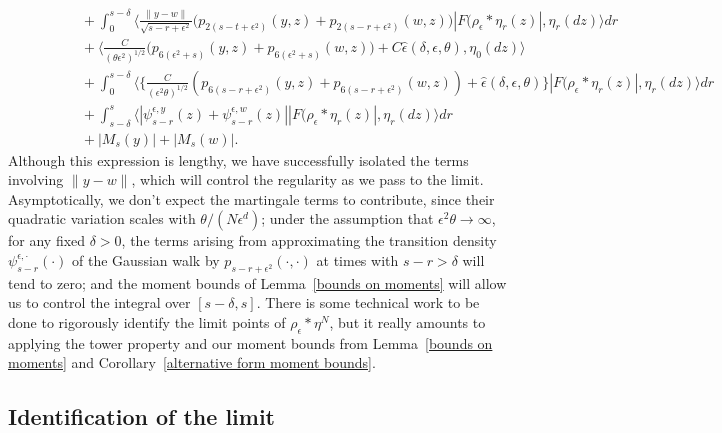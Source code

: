 \documentclass[EJP]{ejpecp} %
\begin{document}
\begin{align}
\nonumber
\\ & \qquad \qquad  {}
+
\int_0^{s-\delta}\Big\langle\frac{\|y-w\|}{\sqrt{s-r+\epsilon^2}}
    \big(p_{2(s-t+\epsilon^2)}(y,z)+p_{2(s-r+\epsilon^2)}(w,z)\big)
    |F(\rho_\epsilon*\eta_r(z)|, 
\eta_r(dz)\Big\rangle dr
\nonumber
\\ & \qquad \qquad  {}
+
\Big\langle \frac{C}{(\theta\epsilon^2)^{1/2}}\Big( 
	p_{6(\epsilon^2+s)}(y,z)+p_{6(\epsilon^2+s)}(w,z)\Big)+
	C \widehat{\epsilon}(\delta,\epsilon,\theta) , \eta_0(dz)
\Big\rangle
\nonumber
\\ & \qquad \qquad  {}
+
\int_0^{s-\delta}
\big\langle \Big\{
\frac{C}{(\epsilon^2\theta)^{1/2}}
(p_{6(s-r+\epsilon^2)}(y,z)+ p_{6(s-r+\epsilon^2)}(w,z))
+\widehat{\epsilon}(\delta,\epsilon,\theta)\Big\}
|F(\rho_\epsilon*\eta_r(z)|, 
\eta_r(dz) \big\rangle  dr
\nonumber
    \\ &\qquad \qquad {}
+ \int_{s-\delta}^s \big\langle 
|\psi_{s-r}^{\epsilon,y}(z) + \psi_{s-r}^{\epsilon, w}(z) |
|F(\rho_\epsilon*\eta_r(z)|, 
\eta_r(dz) \big\rangle  dr
\nonumber
\\ & \qquad \qquad  {}
+ |M_s(y)|+|M_s(w)|. 
\label{difference in rhos}
\end{align} 
Although this expression is lengthy, we have successfully isolated the
terms involving $\|y-w\|$, which will control the regularity as we pass to the
limit. Asymptotically, we 
don't expect the martingale terms to contribute, since their 
quadratic variation scales with $\theta/(N\epsilon^d)$; %
under the assumption that $\epsilon^2\theta\to\infty$,
for any fixed $\delta>0$, %
the terms arising from 
approximating the transition 
density $\psi_{s-r}^{\epsilon, \cdot}(\cdot)$ of the Gaussian 
walk by $p_{s-r+\epsilon^2}(\cdot,\cdot)$ at times 
with $s-r>\delta$ will tend to zero; and  
the moment bounds of Lemma~\ref{bounds on moments} 
will allow us to control the integral over $[s-\delta, s]$.
There is some technical work to be done to rigorously identify the
limit points of $\rho_\epsilon*\eta^N$, but 
it really amounts to 
applying the tower property and our moment bounds from 
Lemma~\ref{bounds on moments} and 
Corollary~\ref{alternative form moment bounds}.


\subsection{Identification of the limit}
\label{limit in onestep case}
\end{document}
